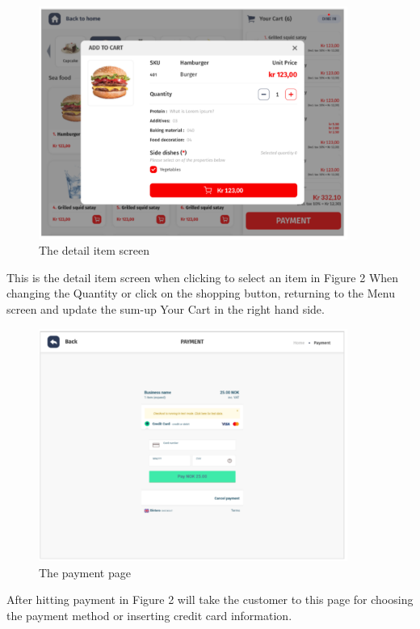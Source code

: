 \documentclass[a4paper]{article}
\numberwithin{equation}{section}
\begin{document}
\begin{figure}[H]
  \centering
  \includegraphics[width=0.9\textwidth]{UI_detail.png}
  \caption{The detail item screen}
\end{figure}

This is the detail item screen when clicking to select an item in Figure 2
When changing the Quantity or click on the shopping button, returning to the Menu screen and update the sum-up Your Cart in the right hand side.

\begin{figure}[H]
  \centering
  \includegraphics[width=0.9\textwidth]{UI_payment.png}
  \caption{The payment page}
\end{figure}

After hitting payment in Figure 2 will take the customer to this page for choosing the payment method or inserting credit card information.
\end{document}

